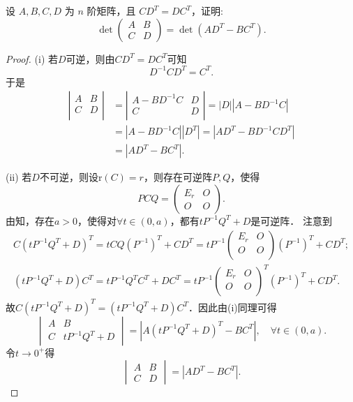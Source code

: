 \documentclass[../../main.tex]{subfiles}%
\begin{document}
\begin{example}
设 \( A,B,C,D \) 为 \( n \) 阶矩阵，且 \( CD^T = DC^T \)，证明:
$$\det \begin{pmatrix} A & B \\ C & D \end{pmatrix} = \det(AD^T - BC^T).$$
\end{example}
\begin{proof}
(i) 若$D$可逆，则由$CD^T=DC^T$可知
$$D^{-1}CD^T=C^T.$$
于是
\begin{align*}
\left| \begin{matrix}
A&		B\\
C&		D\\
\end{matrix} \right|&=\left| \begin{matrix}
	A-BD^{-1}C&		D\\
	C&		D\\
\end{matrix} \right|=\left| D \right|\left| A-BD^{-1}C \right|
\\
&=\left| A-BD^{-1}C \right|\left| D^T \right|=\left| AD^T-BD^{-1}CD^T \right|
\\
&=\left| AD^T-BC^T \right|.
\end{align*}

(ii) 若$D$不可逆，则设$\text{r}(C)=r$，则存在可逆阵$P,Q$，使得
$$PCQ=\begin{pmatrix} E_r & O \\ O & O \end{pmatrix}.$$
由知，存在$a>0$，使得对$\forall t\in (0,a)$，都有$tP^{-1}Q^T+D$是可逆阵．
注意到
\begin{gather*}
C\left( tP^{-1}Q^T+D \right) ^T=tCQ\left( P^{-1} \right) ^T+CD^T=tP^{-1}\left( \begin{matrix}
E_r&		O\\
O&		O\\
\end{matrix} \right) \left( P^{-1} \right) ^T+CD^T;
\\
\left( tP^{-1}Q^T+D \right) C^T=tP^{-1}Q^TC^T+DC^T=tP^{-1}\left( \begin{matrix}
E_r&		O\\
O&		O\\
\end{matrix} \right) ^T\left( P^{-1} \right) ^T+CD^T.
\end{gather*}
故$C\left( tP^{-1}Q^T+D \right)^T=\left( tP^{-1}Q^T+D \right) C^T$．因此由(i)同理可得
$$\begin{vmatrix} A & B \\ C & tP^{-1}Q^T+D \end{vmatrix}=\left| A\left( tP^{-1}Q^T+D \right)^T-BC^T \right|,\quad \forall t\in (0,a).$$
令$t\rightarrow 0^+$得
$$\begin{vmatrix} A & B \\ C & D \end{vmatrix}=\left| AD^T-BC^T \right|.$$
\end{proof}
\end{document}
